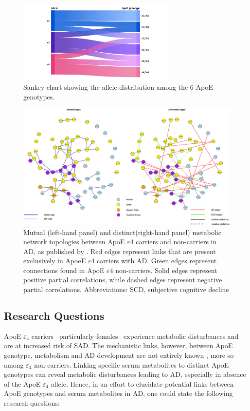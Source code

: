 \documentclass{amsart}
\theoremstyle{plain}
\begin{document}
\begin{figure}[]
  \includegraphics[width=0.7\textwidth]{figures/ApoE@2x.png}
    \caption{Sankey chart showing the allele distribution among the 6 ApoE genotypes.}
  \label{fig1}
\end{figure}

\begin{figure}[b!]
\vspace*{-1cm}
  \includegraphics[width=\textwidth]{figures/network.jpeg}
    \caption{Mutual (left-hand panel) and distinct(right-hand panel) metabolic network topologies between ApoE $\varepsilon4$ carriers and non-carriers in AD, as published by \citeauthor{deLeeuw2017Blood-basedDisease}. Red edges represent links that are present exclusively in ApoeE $\varepsilon4$ carriers with AD. Green edges represent connections found in ApoE $\varepsilon4$ non-carriers. Solid edges represent positive partial correlations, while dashed edges represent negative partial correlations. Abbreviations: SCD, subjective cognitive decline }
  \label{fig2}
\end{figure}

\newpage
\subsection{Research Questions}
ApoE $\varepsilon_4$ carriers --particularly females-- experience metabolic disturbances and are at increased risk of SAD. The mechanistic links, however, between ApoE genotype, metabolism and AD development are not entirely known \cite{Fernandez-Calle2022APOEDiseases}, more so among $\varepsilon_4$ non-carriers. Linking specific serum metabolites to distinct ApoE genotypes can reveal metabolic disturbances leading to AD, especially in absence of the ApoE $\varepsilon_4$ allele. Hence, in an effort to elucidate potential links between ApoE genotypes and serum metabolites in AD, one could state the following research questions:
\end{document}
